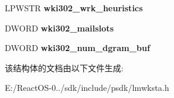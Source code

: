 \begin{DoxyCompactItemize}
\item 
\mbox{\label{struct___w_k_s_t_a___i_n_f_o__302_a2f8712e3349202e6efde08d695f76232}} 
L\+P\+W\+S\+TR {\bfseries wki302\+\_\+wrk\+\_\+heuristics}
\item 
\mbox{\label{struct___w_k_s_t_a___i_n_f_o__302_ae3a9b5190e9d7d148130a4240e856b57}} 
D\+W\+O\+RD {\bfseries wki302\+\_\+mailslots}
\item 
\mbox{\label{struct___w_k_s_t_a___i_n_f_o__302_aab512877f428dbe78b50e2a1a80b7d0c}} 
D\+W\+O\+RD {\bfseries wki302\+\_\+num\+\_\+dgram\+\_\+buf}
\end{DoxyCompactItemize}


该结构体的文档由以下文件生成\+:\begin{DoxyCompactItemize}
\item 
E\+:/\+React\+O\+S-\/0../sdk/include/psdk/lmwksta.\+h\end{DoxyCompactItemize}
